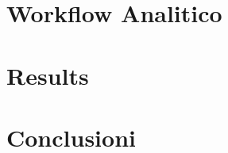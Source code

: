 \documentclass[a4paper,12pt,oneside]{book}
\begin{document}
\chapter{Workflow Analitico}
\label{cap:chapter3}


\chapter{Results}
\label{cap:chapter4}



\chapter{Conclusioni}
\label{cap:conclusion}



% 




\end{document}
